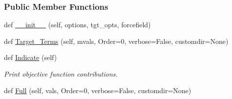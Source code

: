 \subsubsection*{Public Member Functions}
\begin{DoxyCompactItemize}
\item 
def \hyperlink{classsrc_1_1objective_1_1Objective_a3477b29b852f883a0c7c2d7d33681e81}{\+\_\+\+\_\+init\+\_\+\+\_\+} (self, options, tgt\+\_\+opts, forcefield)
\item 
def \hyperlink{classsrc_1_1objective_1_1Objective_a3e048f9ef39a1be74237d609ba012b32}{Target\+\_\+\+Terms} (self, mvals, Order=0, verbose=False, customdir=None)
\item 
def \hyperlink{classsrc_1_1objective_1_1Objective_a18701bc88cb55e89b195a2dba2e6fca2}{Indicate} (self)
\begin{DoxyCompactList}\small\item\em Print objective function contributions. \end{DoxyCompactList}\item 
def \hyperlink{classsrc_1_1objective_1_1Objective_a187f9fbe63483e6aa6bbf5c546d983e5}{Full} (self, vals, Order=0, verbose=False, customdir=None)
\end{DoxyCompactItemize}
